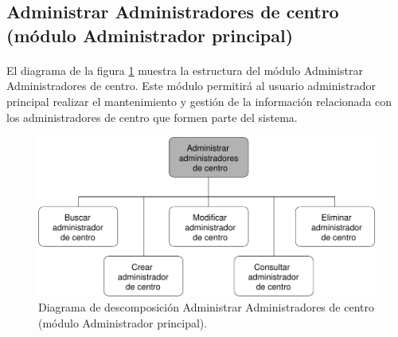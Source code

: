 \subsection{Administrar Administradores de centro (módulo Administrador principal)}

  \paragraph{}El diagrama de la figura
  \ref{diagramaDescomposicionAdministrarAdministradoresCentro} muestra la
  estructura del módulo Administrar Administradores de centro. Este módulo
  permitirá al usuario administrador principal realizar el mantenimiento y
  gestión de la información relacionada con los administradores de centro que
  formen parte del sistema.


  \begin{figure}[!ht]
    \begin{center}
      \includegraphics[]{11.Disenyo_Arquitectonico/11.2.Diagramas_Descomposicion/11.2.2.Modulo_administrador_principal/AdministrarBBDD/AdministrarUsuarios/AdministrarAdministradoresCentro/Diagramas/administrar_administradores_centro.pdf}
      \caption{Diagrama de descomposición Administrar Administradores de centro (módulo Administrador principal).}
      \label{diagramaDescomposicionAdministrarAdministradoresCentro}
    \end{center}
  \end{figure}
